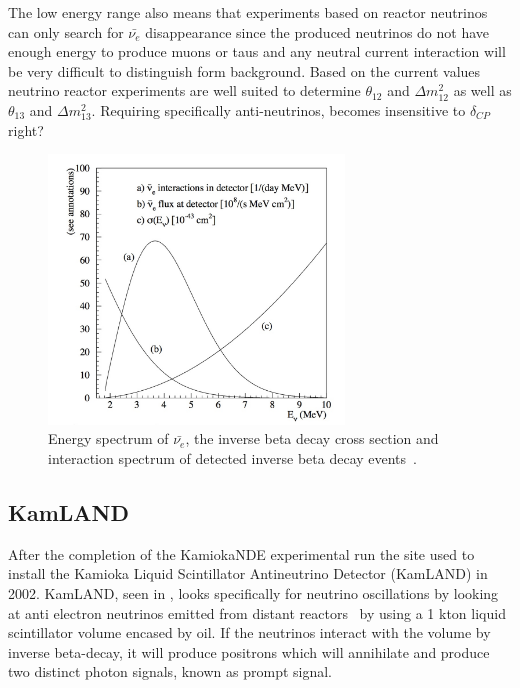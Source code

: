 The low energy range also means that experiments based on reactor neutrinos can only search for $\bar{\nu_e}$ disappearance since the produced neutrinos do not have enough energy to produce muons or taus and any neutral current interaction will be very difficult to distinguish form background. Based on the current values neutrino reactor experiments are well suited to determine $\theta_{12}$ and $\Delta m_{12}^2 $ as well as  $\theta_{13}$ and $\Delta m_{13}^2$. Requiring specifically anti-neutrinos, becomes insensitive to $\delta_{CP}$ right?

\begin{figure}[h!]
\centering
  \centering
\includegraphics[width=0.7\textwidth]{figures/reactor.jpeg}
\vspace{2mm}
\caption{Energy spectrum of $\bar{\nu_e}$, the inverse beta decay cross section and interaction spectrum of detected inverse beta decay events~\cite{65Reactor}.}
\label{fig:reactor}
\end{figure}

\subsection{KamLAND}
After the completion of the KamiokaNDE experimental run the site used to install the Kamioka Liquid Scintillator Antineutrino Detector (KamLAND) in 2002. KamLAND, seen in , looks specifically for neutrino oscillations by looking at anti electron neutrinos emitted from distant reactors~\cite{46KamLAND} by using a 1 kton liquid scintillator volume encased by oil. If the neutrinos interact with the volume by inverse beta-decay, it will produce positrons which will annihilate and produce two distinct photon signals, known as prompt signal.

